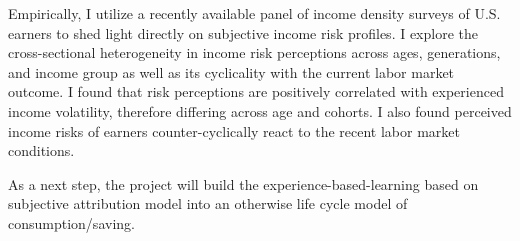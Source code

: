 \documentclass[12pt,notitlepage,onecolumn,aps,pra]{article}
\begin{document}
Empirically, I utilize a recently available panel of income density
surveys of U.S. earners to shed light directly on subjective income risk
profiles. I explore the cross-sectional heterogeneity in income risk
perceptions across ages, generations, and income group as well as its
cyclicality with the current labor market outcome. I found that risk
perceptions are positively correlated with experienced income
volatility, therefore differing across age and cohorts. I also found
perceived income risks of earners counter-cyclically react to the recent
labor market conditions.

As a next step, the project will build the experience-based-learning
based on subjective attribution model into an otherwise life cycle model
of consumption/saving.


    
    



    
\end{document}
